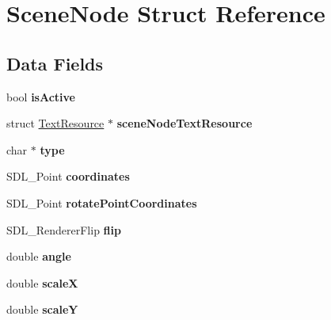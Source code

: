 \hypertarget{struct_scene_node}{}\section{Scene\+Node Struct Reference}
\label{struct_scene_node}
\subsection*{Data Fields}
\begin{DoxyCompactItemize}
\item 
\hypertarget{struct_scene_node_a96eff8420fb9ee1b4c5d5f1bcace116d}{}\label{struct_scene_node_a96eff8420fb9ee1b4c5d5f1bcace116d} 
bool {\bfseries is\+Active}
\item 
\hypertarget{struct_scene_node_a9595a68ef5977595b838f7edad1bcfe3}{}\label{struct_scene_node_a9595a68ef5977595b838f7edad1bcfe3} 
struct \hyperlink{struct_text_resource}{Text\+Resource} $\ast$ {\bfseries scene\+Node\+Text\+Resource}
\item 
\hypertarget{struct_scene_node_a23506fc4821ab6d9671f3e6222591a96}{}\label{struct_scene_node_a23506fc4821ab6d9671f3e6222591a96} 
char $\ast$ {\bfseries type}
\item 
\hypertarget{struct_scene_node_a667ad041f76f3b99c2ea65cd78b668ea}{}\label{struct_scene_node_a667ad041f76f3b99c2ea65cd78b668ea} 
S\+D\+L\+\_\+\+Point {\bfseries coordinates}
\item 
\hypertarget{struct_scene_node_af6753b63e96d86515e63e68c527ff215}{}\label{struct_scene_node_af6753b63e96d86515e63e68c527ff215} 
S\+D\+L\+\_\+\+Point {\bfseries rotate\+Point\+Coordinates}
\item 
\hypertarget{struct_scene_node_a53e571e5a895ca006bf1ca38cd681ab1}{}\label{struct_scene_node_a53e571e5a895ca006bf1ca38cd681ab1} 
S\+D\+L\+\_\+\+Renderer\+Flip {\bfseries flip}
\item 
\hypertarget{struct_scene_node_a79dea7ed146af26ff4a0ba4bf5c83eee}{}\label{struct_scene_node_a79dea7ed146af26ff4a0ba4bf5c83eee} 
double {\bfseries angle}
\item 
\hypertarget{struct_scene_node_af04d6c916584bdddd6a334359ff1059d}{}\label{struct_scene_node_af04d6c916584bdddd6a334359ff1059d} 
double {\bfseries scaleX}
\item 
\hypertarget{struct_scene_node_a936cc64e631dcd2b4ea124d5d8d4fe38}{}\label{struct_scene_node_a936cc64e631dcd2b4ea124d5d8d4fe38} 
double {\bfseries scaleY}
\item 
\hypertarget{struct_scene_node_a8153fb8b7d19bc0fb8c732014085e19b}{}\label{struct_scene_node_a8153fb8b7d19bc0fb8c732014085e19b} 

\end{DoxyCompactItemize}

